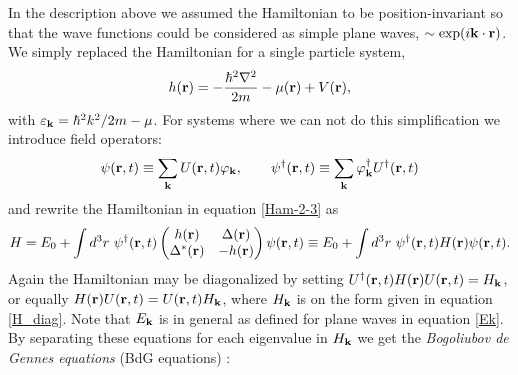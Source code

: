 \\
\\
In the description above we assumed the Hamiltonian to be position-invariant so that the wave functions could be considered as simple plane waves, $\sim \exp(i\mathbf{k}\cdot\mathbf{r}) $. We simply replaced the Hamiltonian for a single particle system, 
\begin{equation}
    h(\mathbf{r}) = -\frac{\hbar^2 \nabla^2}{2m} -\mu(\mathbf{r}) + V(\mathbf{r}),
\label{Ham-2-4}
\end{equation}
with $\varepsilon_{\mathbf{k}} = \hbar^2k^2/2m - \mu$. For systems where we can not do this simplification we introduce field operators:
\begin{equation}
    \psi(\mathbf{r},t) \equiv \sum_{\mathbf{k}}U(\mathbf{r},t)\varphi_{\mathbf{k}}, \qquad \psi^{\dagger}(\mathbf{r},t) \equiv \sum_{\mathbf{k}}\varphi_{\mathbf{k}}^{\dagger}U^{\dagger}(\mathbf{r},t) 
\end{equation}
and rewrite the Hamiltonian in equation \eqref{Ham-2-3} as
\begin{equation}
    H = E_0 + \int d^3r \ \psi^{\dagger}(\rbf,t)
    \begin{pmatrix}
        h(\rbf) & \Delta(\rbf) \\
        \Delta^*(\rbf) & -h(\rbf)
    \end{pmatrix}
    \psi(\rbf,t)
    \equiv E_0 + \int d^3r \ \psi^{\dagger}(\rbf,t) H(\rbf) \psi(\rbf,t).
\end{equation}
Again the Hamiltonian may be diagonalized by setting $U^{\dagger}(\mathbf{r},t)H(\mathbf{r})U(\mathbf{r},t) = H_{\mathbf{k}}$, or equally $H(\mathbf{r})U(\mathbf{r},t) = U(\mathbf{r},t)H_{\mathbf{k}}$, where $H_{\mathbf{k}}$ is on the form given in equation \eqref{H_diag}. Note that $E_{\mathbf{k}}$ is in general as defined for plane waves in equation \eqref{Ek}. %
By separating these equations for each eigenvalue in $H_{\mathbf{k}}$ we get the \textit{Bogoliubov de Gennes equations} (BdG equations) \cite{BdG}:
